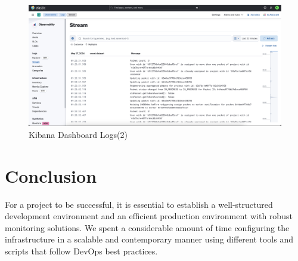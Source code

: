 \begin{figure}[H]
  \centering
  \includegraphics[width=1\textwidth]{src/assets/chapters/kibanalogs2.png}
  \caption{Kibana Dashboard Logs(2)}
  \label{fig:kibana-dash-logs-2}
\end{figure}


\setcounter{secnumdepth}{0}
\section{Conclusion}
For a project to be successful, it is essential to establish a well-structured development environment and an efficient production environment with robust monitoring solutions. We spent a considerable amount of time configuring the infrastructure in a scalable and contemporary manner using different tools and scripts that follow DevOps best practices.